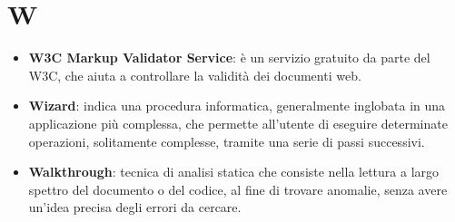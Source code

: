 \section{W}
\begin{itemize}
	\item
	\textbf{W3C Markup Validator Service}:  è un servizio gratuito da parte del W3C, che aiuta a controllare la validità dei documenti web.
	\item 
	\textbf{Wizard}: indica una procedura informatica, generalmente inglobata in una applicazione più complessa, che permette all'utente di eseguire determinate operazioni, solitamente complesse, tramite una serie di passi successivi.
	\item
	\textbf{Walkthrough}: tecnica di analisi statica che consiste nella lettura a largo spettro del documento o del codice, al fine di trovare anomalie, senza avere un'idea precisa degli errori da cercare.
\end{itemize}
